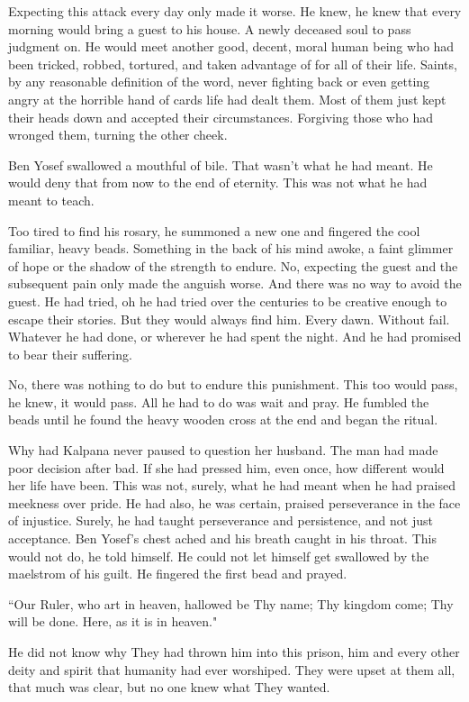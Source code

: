 \documentclass{amsart}
\begin{document}
Expecting this attack every day only made it worse. He knew, he knew that every morning would bring a guest to his house. A newly deceased soul to pass judgment on. He would meet another good, decent, moral human being who had been tricked, robbed, tortured, and taken advantage of for all of their life.  Saints, by any reasonable definition of the word, never fighting back or even getting angry at the horrible hand of cards life had dealt them. Most of them just kept their heads down and accepted their circumstances. Forgiving those who had wronged them, turning the other cheek. 

Ben Yosef swallowed a mouthful of bile. That wasn't what he had meant. He would deny that from now to the end of eternity. This was not what he had meant to teach.

Too tired to find his rosary, he summoned a new one and fingered the cool familiar, heavy beads. Something in the back of his mind awoke, a faint glimmer of hope or the shadow of the strength to endure. No, expecting the guest and the subsequent pain only made the anguish worse. And there was no way to avoid the guest. He had tried, oh he had tried over the centuries to be creative enough to escape their stories. But they would always find him. Every dawn. Without fail. Whatever he had done, or wherever he had spent the night. And he had promised to bear their suffering. 

No, there was nothing to do but to endure this punishment. This too would pass, he knew, it would pass. All he had to do was wait and pray. He fumbled the beads until he found the heavy wooden cross at the end and began the ritual.

Why had Kalpana never paused to question her husband. The man had made poor decision after bad. If she had pressed him, even once, how different would her life have been. This was not, surely, what he had meant when he had praised meekness over pride. He had also, he was certain, praised perseverance in the face of injustice. Surely, he had taught perseverance and persistence, and not just acceptance. Ben Yosef's chest ached and his breath caught in his throat. This would not do, he told himself. He could not let himself get swallowed by the maelstrom of his guilt. He fingered the first bead and prayed. 

``Our Ruler, who art in heaven, hallowed be Thy name; Thy kingdom come; Thy will be done. Here, as it is in heaven."

He did not know why They had thrown him into this prison, him and every other deity and spirit that humanity had ever worshiped. They were upset at them all, that much was clear, but no one knew what They wanted. 
\end{document}
